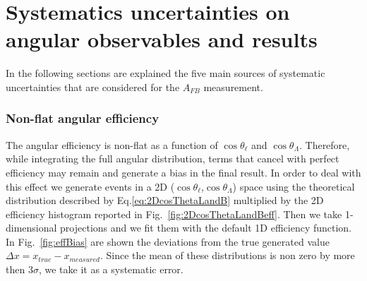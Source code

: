 \chapter{Systematics uncertainties on angular observables and results}

In the following sections are explained the five main sources of systematic uncertainties that are considered for the $A_{FB}$ measurement.

\subsection{Non-flat angular efficiency}

The angular efficiency is non-flat as a function of $\cos\theta_\ell$ and $\cos \theta_\Lambda$.
Therefore, while integrating the full angular distribution, terms that cancel with perfect efficiency may
remain and generate a bias in the final result. In order to deal with this effect we generate events
in a 2D ($\cos\theta_\ell$,$\cos \theta_\Lambda$) space using the theoretical distribution described by
Eq.\ref{eq:2DcosThetaLandB} multiplied by the 2D efficiency histogram reported in Fig.~\ref{fig:2DcosThetaLandBeff}.
Then we take 1-dimensional projections and we fit them with the default 1D efficiency function.
In Fig.~\ref{fig:effBias} are shown the deviations from the true generated value $\Delta x = x_{true} - x_{measured}$.
Since the mean of these distributions is non zero by more then 3$\sigma$, we take it as a systematic error.

